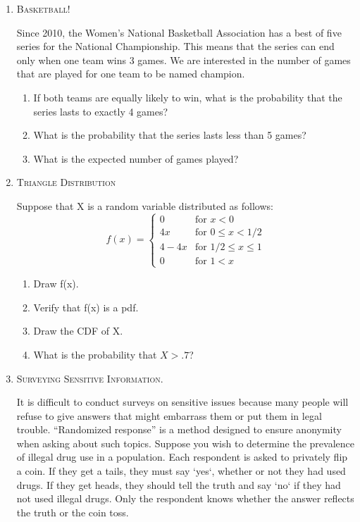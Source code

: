 \documentclass[11pt,letterpaper]{article}
\numberwithin{equation}{section}
\begin{document}
\begin{enumerate}[I]
\begin{enumerate}[1)]
\begin{enumerate}
\end{enumerate}
\pagebreak
\item \textsc{Basketball!} 

Since 2010, the Women's National Basketball Association has a best of five series for the National Championship.  This means that the series can end only when one team wins 3 games.  We are interested in the number of games that are played for one team to be named champion.
\begin{enumerate}[1)]
\item If both teams are equally likely to win, what is the probability that the series lasts to exactly 4 games?
\item What is the probability that the series lasts less than 5 games?
\item What is the expected number of games played? 
\end{enumerate}


\item \textsc{Triangle Distribution} 

Suppose that X is a random variable distributed as follows:
$$f(x)=\begin{cases} 0 & \text{for } x< 0\\ 4x & \text{for } 0\leq x < 1/2 \\ 4-4x  & \text{for }  1/2 \leq x\leq 1\\ 0 &\text{for } 1<x
\end{cases}$$
\begin{enumerate}[1)]
\item Draw f(x).
\item Verify that f(x) is a pdf.  
\item Draw the CDF of X.
\item What is the probability that $X > .7$?
\end{enumerate}
\item \textsc{Surveying Sensitive Information.}

It is difficult to conduct surveys on sensitive issues because many people will refuse to give answers that might embarrass them or put them in legal trouble. ``Randomized response'' is a method designed to ensure anonymity when asking about such topics. Suppose you wish to determine the prevalence of illegal drug use in a population.  Each respondent is asked to privately flip a coin. If they get a tails, they must say `yes`, whether or not they had used drugs.  If they get heads, they should tell the truth and say `no` if they had not used illegal drugs.  Only the respondent knows whether the answer reflects the truth or the coin toss.


\end{enumerate}
\end{enumerate}
\end{document}
